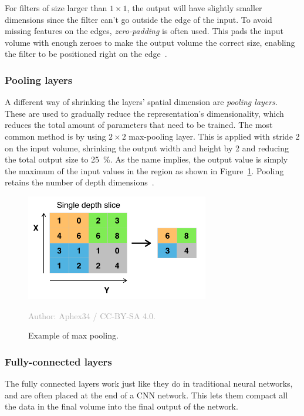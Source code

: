 \documentclass{kththesis}
\newcommand{\source}[1]{\vspace{-5mm}\caption*{\textcolor{darkgray}{Author: {#1}}\vspace{-7mm}} }
\begin{document}
For filters of size larger than $1 \times 1$, the output will have slightly smaller dimensions since the filter can't go outside the edge of the input. To avoid missing features on the edges, \textit{zero-padding} is often used. This pads the input volume with enough zeroes to make the output volume the correct size, enabling the filter to be positioned right on the edge~\cite{cnnIntro}.

\subsubsection{Pooling layers}
A different way of shrinking the layers' spatial dimension are \textit{pooling layers}. These are used to gradually reduce the representation's dimensionality, which reduces the total amount of parameters that need to be trained. The most common method is by using $2\times 2$ max-pooling layer. This is applied with stride 2 on the input volume, shrinking the output width and height by 2 and reducing the total output size to 25~\%. As the name implies, the output value is simply the maximum of the input values in the region as shown in Figure~\ref{fig:max_pooling}. Pooling retains the number of depth dimensions~\cite{cnnIntro}.

\begin{figure}
  \begin{center}
    \includegraphics[width=80mm]{img/max_pooling.png}
    \caption{Example of max pooling.}
    \source{Aphex34 / CC-BY-SA 4.0.}
    \label{fig:max_pooling}
  \end{center}
\end{figure}

\subsubsection{Fully-connected layers}
The fully connected layers work just like they do in traditional neural networks, and are often placed at the end of a CNN network. This lets them compact all the data in the final volume into the final output of the network.
\end{document}
